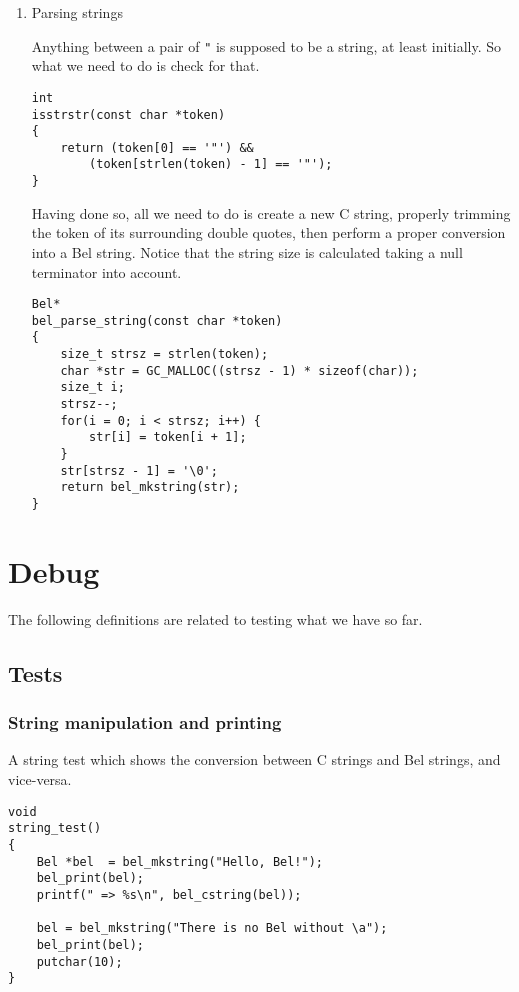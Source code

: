 \documentclass[openright,a4paper,twoside,12pt]{memoir}
\begin{document}
\begin{enumerate}
\item Parsing strings
\label{sec:orgee32104}

Anything between  a pair  of \texttt{"} is  supposed to be  a string,  at least
initially. So what we need to do is check for that.

\begin{verbatim}
int
isstrstr(const char *token)
{
    return (token[0] == '"') &&
        (token[strlen(token) - 1] == '"');
}
\end{verbatim}

Having done so, all  we need to do is create a  new C string, properly
trimming the  token of its  surrounding double quotes, then  perform a
proper conversion  into a Bel string.  Notice that the string  size is
calculated taking a null terminator into account.

\begin{verbatim}
Bel*
bel_parse_string(const char *token)
{
    size_t strsz = strlen(token);
    char *str = GC_MALLOC((strsz - 1) * sizeof(char));
    size_t i;
    strsz--;
    for(i = 0; i < strsz; i++) {
        str[i] = token[i + 1];
    }
    str[strsz - 1] = '\0';
    return bel_mkstring(str);
}
\end{verbatim}
\end{enumerate}

\chapter{Debug}
\label{sec:org3fe004d}

The following definitions are related to testing what we have so
far.

\section{Tests}
\label{sec:org8f11628}
\subsection{String manipulation and printing}
\label{sec:orgd0fd8f0}

A string test which shows the conversion between C strings and Bel
strings, and vice-versa.

\begin{verbatim}
void
string_test()
{
    Bel *bel  = bel_mkstring("Hello, Bel!");
    bel_print(bel);
    printf(" => %s\n", bel_cstring(bel));

    bel = bel_mkstring("There is no Bel without \a");
    bel_print(bel);
    putchar(10);
}
\end{verbatim}
\end{document}
